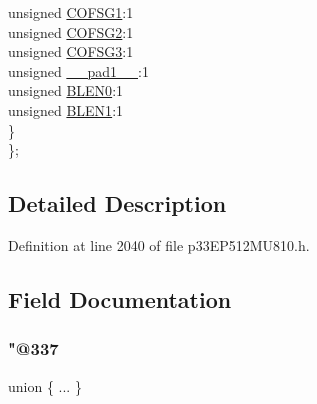 \begin{DoxyCompactItemize}
\begin{tabbing}
\>\>unsigned \hyperlink{structtag_d_c_i_c_o_n2_b_i_t_s_af2c580284c7b57e891ab31cbd762667e}{COFSG1}:1\\
\>\>unsigned \hyperlink{structtag_d_c_i_c_o_n2_b_i_t_s_a71c11c1ce5435a45dc63e047b0e47c2c}{COFSG2}:1\\
\>\>unsigned \hyperlink{structtag_d_c_i_c_o_n2_b_i_t_s_af28a4f68dfa488717a3eb5bc8cd38a46}{COFSG3}:1\\
\>\>unsigned \hyperlink{structtag_d_c_i_c_o_n2_b_i_t_s_acaf2d0924a107ec6e8d2e31febaf66f9}{\_\_pad1\_\_}:1\\
\>\>unsigned \hyperlink{structtag_d_c_i_c_o_n2_b_i_t_s_acbd435940d7ea6640c4af90d27e709dd}{BLEN0}:1\\
\>\>unsigned \hyperlink{structtag_d_c_i_c_o_n2_b_i_t_s_a6607e48b0560857914f68a349001445d}{BLEN1}:1\\
\>\} \\
\}; \\

\end{tabbing}\end{DoxyCompactItemize}


\subsection{Detailed Description}


Definition at line 2040 of file p33\+E\+P512\+M\+U810.\+h.



\subsection{Field Documentation}
\mbox{\label{structtag_d_c_i_c_o_n2_b_i_t_s_aa12edabe6b9facf728c37b99b6d24ccb}} 
\subsubsection{\texorpdfstring{"@337}{@337}}
{\footnotesize\ttfamily union \{ ... \} }

\mbox{\label{structtag_d_c_i_c_o_n2_b_i_t_s_adf71f3d8410c1f1dbbc96680a92c49af}} 
